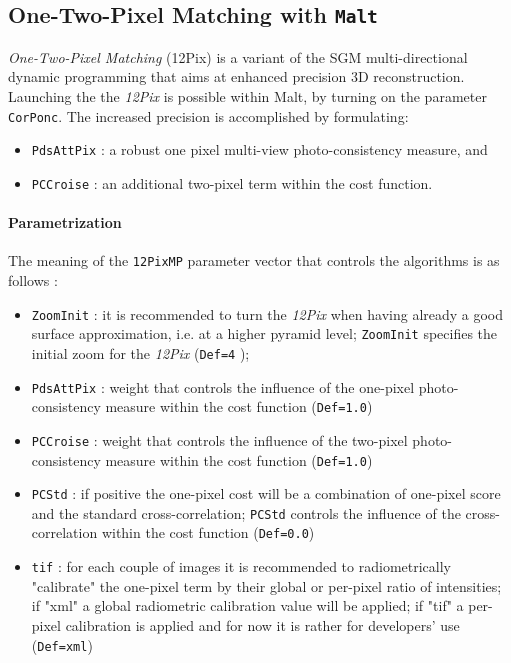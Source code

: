 
\subsection{One-Two-Pixel Matching with {\tt Malt}}
%
\textit{One-Two-Pixel Matching} (12Pix) is a variant of the SGM multi-directional dynamic programming that aims at enhanced precision 3D reconstruction. Launching the the \textit{12Pix} is possible within Malt, by turning on the parameter {\tt CorPonc}. The increased precision is accomplished by formulating:
\begin{itemize}
\item  {\tt{PdsAttPix}} : a robust one pixel multi-view photo-consistency measure, and
\item  {\tt{PCCroise}} : an additional two-pixel term within the cost function.
\end{itemize} 



\paragraph*{Parametrization}
The meaning of the {\tt 12PixMP} parameter vector that controls the algorithms is as follows : 
\begin{itemize}
\item {\tt ZoomInit} : it is recommended to turn the \textit{12Pix} when having already a good surface approximation, i.e. at a higher pyramid level; {\tt ZoomInit} specifies the initial zoom for the \textit{12Pix} ({\tt Def=4} );
\item {\tt{PdsAttPix}} : weight that controls the influence of  the one-pixel photo-consistency measure within the cost function ({\tt Def=1.0})
\item {\tt{PCCroise}} : weight that controls the influence of  the two-pixel photo-consistency measure within the cost function ({\tt Def=1.0})
\item {\tt{PCStd}} : if positive the one-pixel cost will be a combination of one-pixel score and the standard cross-correlation; {\tt{PCStd}} controls the influence of the cross-correlation within the cost function ({\tt Def=0.0})
\item {\tt{tif}} : for each couple of images it is recommended to radiometrically "calibrate" the one-pixel term by their global or per-pixel ratio of intensities; if "xml" a global radiometric calibration value will be applied; if "tif" a per-pixel calibration is applied and for now it is rather for developers' use ({\tt{Def=xml}})
\end{itemize} \par 
%
